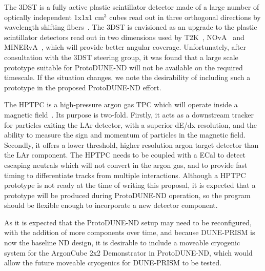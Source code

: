 The 3DST is a fully active plastic scintillator detector made of a large number of optically independent 1x1x1 cm$^{3}$ cubes read out in three orthogonal directions by wavelength shifting fibers~\cite{3dst}. The 3DST is envisioned as an upgrade to the plastic scintillator detectors read out in two dimensions used by T2K~\cite{t2k-fgd,t2k-ingrid}, NOvA~\cite{nova} and MINERvA~\cite{minerva-nim}, which will provide better angular coverage. Unfortunately, after consultation with the 3DST steering group, it was found that a large scale prototype suitable for ProtoDUNE-ND will not be available on the required timescale. If the situation changes, we note the desirability of including such a prototype in the proposed ProtoDUNE-ND effort.

The HPTPC is a high-pressure argon gas TPC which will operate inside a magnetic field~\cite{dune_ndcsg}. Its purpose is two-fold. Firstly, it acts as a downstream tracker for particles exiting the LAr detector, with a superior dE/dx resolution, and the ability to measure the sign and momentum of particles in the magnetic field. Secondly, it offers a lower threshold, higher resolution argon target detector than the LAr component. The HPTPC needs to be coupled with a ECal to detect escaping neutrals which will not convert in the argon gas, and to provide fast timing to differentiate tracks from multiple interactions. Although a HPTPC prototype is not ready at the time of writing this proposal, it is expected that a prototype will be produced during ProtoDUNE-ND operation, so the program should be flexible enough to incorporate a new detector component. 

As it is expected that the ProtoDUNE-ND setup may need to be reconfigured, with the addition of more components over time, and because DUNE-PRISM is now the baseline ND design, it is desirable to include a moveable cryogenic system for the ArgonCube 2x2 Demonstrator in ProtoDUNE-ND, which would allow the future moveable cryogenics for DUNE-PRISM to be tested.

